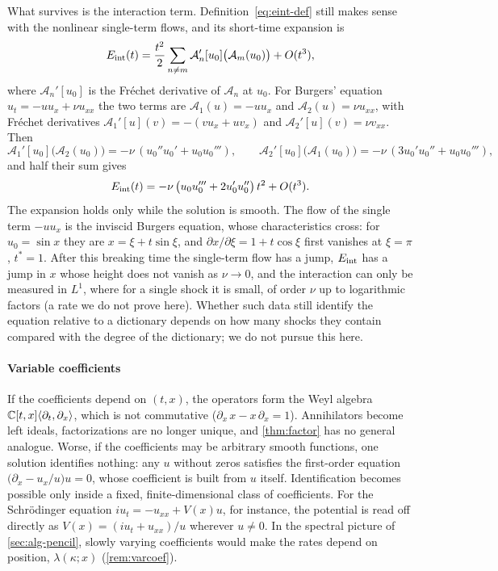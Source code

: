 What survives is the interaction term. Definition~\eqref{eq:eint-def} still makes sense with the
nonlinear single-term flows, and its short-time expansion is
\begin{equation}\label{eq:jet}
  E_{\mathrm{int}}(t)=\frac{t^2}{2}\sum_{n\ne m}\mathcal A_n'[u_0]\big(\mathcal A_m(u_0)\big)+O(t^3),
\end{equation}
where $\mathcal A_n'[u_0]$ is the Fr\'echet derivative of $\mathcal A_n$ at $u_0$. For Burgers' equation
$u_t=-uu_x+\nu u_{xx}$ the two terms are $\mathcal A_1(u)=-uu_x$ and $\mathcal A_2(u)=\nu u_{xx}$, with Fr\'echet
derivatives $\mathcal A_1'[u](v)=-(vu_x+uv_x)$ and $\mathcal A_2'[u](v)=\nu v_{xx}$. Then
\[
  \mathcal A_1'[u_0]\big(\mathcal A_2(u_0)\big)=-\nu\,(u_0''u_0'+u_0u_0'''),\qquad
  \mathcal A_2'[u_0]\big(\mathcal A_1(u_0)\big)=-\nu\,(3u_0'u_0''+u_0u_0'''),
\]
and half their sum gives
\[
  E_{\mathrm{int}}(t)=-\nu\,\big(u_0u_0'''+2u_0'u_0''\big)\,t^2+O(t^3).
\]
The expansion holds only while the solution is smooth. The flow of the single term $-uu_x$ is the inviscid
Burgers equation, whose characteristics cross: for $u_0=\sin x$ they are $x=\xi+t\sin\xi$, and
$\partial x/\partial\xi=1+t\cos\xi$ first vanishes at $\xi=\pi$, $t^*=1$. After this breaking time the single-term flow
has a jump, $E_{\mathrm{int}}$ has a jump in $x$ whose height does not vanish as $\nu\to0$, and the interaction can only be measured in
$L^1$, where for a single shock it is small, of order $\nu$ up to logarithmic factors (a rate we do not prove here).
Whether such data still identify the equation relative to a dictionary depends on how many shocks they contain
compared with the degree of the dictionary; we do not pursue this here.

\paragraph{Variable coefficients}
If the coefficients depend on $(t,x)$, the operators form the Weyl algebra $\mathbb{C}[t,x]\langle\partial_t,\partial_x\rangle$, which
is not commutative ($\partial_x\,x-x\,\partial_x=1$). Annihilators become left ideals, factorizations are no longer unique,
and \cref{thm:factor} has no general analogue. Worse, if the coefficients may be arbitrary smooth functions, one solution
identifies nothing: any $u$ without zeros satisfies the first-order equation $\big(\partial_x-u_x/u\big)u=0$, whose
coefficient is built from $u$ itself. Identification becomes possible only inside a fixed, finite-dimensional class of
coefficients. For the Schr\"odinger equation $iu_t=-u_{xx}+V(x)u$, for instance, the potential is read off directly as
$V(x)=(iu_t+u_{xx})/u$ wherever $u\neq0$. In the spectral picture of \cref{sec:alg-pencil}, slowly varying coefficients
would make the rates depend on position, $\lambda(\kappa;x)$ (\cref{rem:varcoef}).

